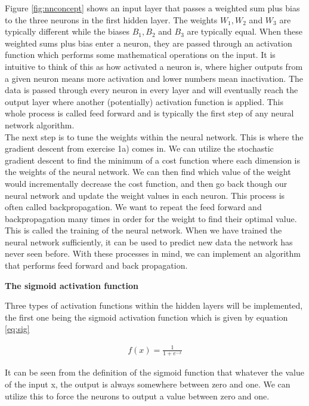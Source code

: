 \documentclass[12pt,a4paper]{article}
\begin{document}
\noindent Figure \ref{fig:nnconcept} shows an input layer that passes a weighted sum plus bias to the three neurons in the first hidden layer. The weights $W_1, W_2$ and $W_3$ are typically different while the biases $B_1, B_2$ and $B_3$ are typically equal. When these weighted sums plus bias enter a neuron, they are passed through an activation function which performs some mathematical operations on the input. It is intuitive to think of this as how activated a neuron is, where higher outputs from a given neuron means more activation and lower numbers mean inactivation. The data is passed through every neuron in every layer and will eventually reach the output layer where another (potentially) activation function is applied. This whole process is called feed forward and is typically the first step of any neural network algorithm.
\\
The next step is to tune the weights within the neural network. This is where the gradient descent from exercise 1a) comes in. We can utilize the stochastic gradient descent to find the minimum of a cost function where each dimension is the weights of the neural network. We can then find which value of the weight would incrementally decrease the cost function, and then go back though our neural network and update the weight values in each neuron. This process is often called backpropagation. We want to repeat the feed forward and backpropagation many times in order for the weight to find their optimal value. This is called the training of the neural network. When we have trained the neural network sufficiently, it can be used to predict new data the network has never seen before. With these processes in mind, we can implement an algorithm that performs feed forward and back propagation.

\begin{center}
\large{\textbf{The sigmoid activation function}}
\end{center}

\noindent Three types of activation functions within the hidden layers will be implemented, the first one being the sigmoid activation function which is given by equation \ref{eq:sig}

\begin{equation}\label{eq:sig}
\begin{aligned}
f(x) = \frac{1}{1 + e^{-x}}
\end{aligned}
\end{equation}

\noindent It can be seen from the definition of the sigmoid function that whatever the value of the input x, the output is always somewhere between zero and one. We can utilize this to force the neurons to output a value between zero and one.
\end{document}
